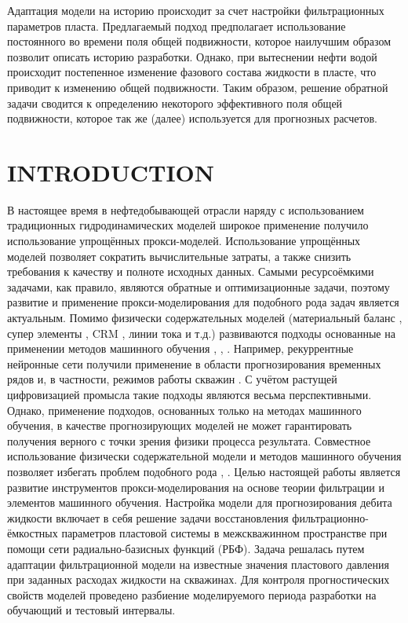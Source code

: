 \documentclass{article}
\begin{document}
\maketitle


Адаптация модели на историю происходит за счет настройки фильтрационных параметров пласта. Предлагаемый подход предполагает использование постоянного во времени поля общей подвижности, которое наилучшим образом позволит описать историю разработки. Однако, при вытеснении нефти водой происходит постепенное изменение фазового состава жидкости в пласте, что приводит к изменению общей подвижности. Таким образом, решение обратной задачи сводится к определению некоторого эффективного поля общей подвижности, которое так же (далее) используется для прогнозных расчетов.

\section{INTRODUCTION}

В настоящее время в нефтедобывающей отрасли наряду с использованием традиционных гидродинамических моделей широкое применение получило использование упрощённых прокси-моделей. Использование упрощённых моделей позволяет сократить вычислительные затраты, а также снизить требования к качеству и полноте исходных данных. Самыми ресурсоёмкими задачами, как правило, являются обратные и оптимизационные задачи, поэтому развитие и применение прокси-моделирования для подобного рода задач является актуальным. Помимо физически содержательных моделей (материальный баланс \cite{mus1}, супер элементы \cite{maz}, CRM \cite{bek}, линии тока \cite{pot} и т.д.) развиваются подходы основанные на применении методов машинного обучения \cite{tem}, \cite{ill}, \cite{uma}. Например, рекуррентные нейронные сети получили применение в области прогнозирования временных рядов и, в частности, режимов работы скважин \cite{gop}. С учётом растущей цифровизацией промысла такие подходы являются весьма перспективными. Однако, применение подходов, основанных только на методах машинного обучения, в качестве прогнозирующих моделей не может гарантировать получения верного с точки зрения физики процесса результата. Совместное использование физически содержательной модели и методов машинного обучения позволяет избегать проблем подобного рода \cite{kos1}, \cite{kos2}.
Целью настоящей работы является развитие инструментов прокси-моделирования на основе теории фильтрации и элементов машинного обучения. Настройка модели для прогнозирования дебита жидкости включает в себя решение задачи восстановления фильтрационно-ёмкостных параметров пластовой системы в межскважинном пространстве при помощи сети радиально-базисных функций (РБФ). Задача решалась путем адаптации фильтрационной модели на известные значения пластового давления при заданных расходах жидкости на скважинах. Для контроля прогностических свойств моделей проведено разбиение моделируемого периода разработки на обучающий и тестовый интервалы.
\end{document}
